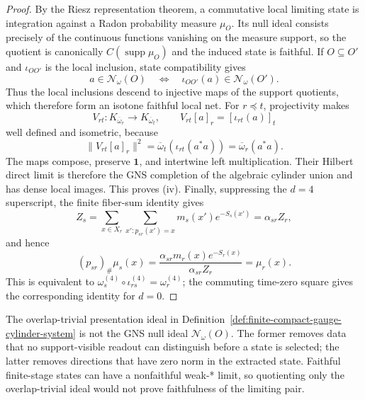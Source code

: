 \begin{proof}
By the Riesz representation theorem, a commutative local limiting state is integration against a
Radon probability measure \(\mu_O\). Its null ideal consists precisely of the continuous functions
vanishing on the measure support, so the quotient is canonically \(C(\operatorname{supp}\mu_O)\)
and the induced state is faithful. If \(O\subseteq O'\) and \(\iota_{OO'}\) is the local
inclusion, state compatibility gives
\[
a\in\mathcal N_\omega(O)
\quad\Longleftrightarrow\quad
\iota_{OO'}(a)\in\mathcal N_\omega(O').
\]
Thus the local inclusions descend to injective maps of the support quotients, which therefore form
an isotone faithful local net. For \(r\preceq t\), projectivity makes
\[
V_{rt}:K_{\overline\omega_r}\longrightarrow K_{\overline\omega_t},
\qquad
V_{rt}[a]_r=[\iota_{rt}(a)]_t
\]
well defined and isometric, because
\[
\|V_{rt}[a]_r\|^2
=\overline\omega_t(\iota_{rt}(a^*a))
=\overline\omega_r(a^*a).
\]
The maps compose, preserve \(\mathbf 1\), and intertwine left multiplication. Their Hilbert
direct limit is therefore the GNS completion of the algebraic cylinder union and has dense local
images. This proves \textup{(iv)}. Finally, suppressing the \(d=4\) superscript, the finite
fiber-sum identity gives
\[
Z_s=\sum_{x\in X_r}\sum_{x':p_{sr}(x')=x}m_s(x')e^{-S_s(x')}
=\alpha_{sr}Z_r,
\]
and hence
\[
(p_{sr})_\#\mu_s(x)
=\frac{\alpha_{sr}m_r(x)e^{-S_r(x)}}{\alpha_{sr}Z_r}
=\mu_r(x).
\]
This is equivalent to \(\omega_s^{(4)}\circ\iota_{rs}^{(4)}=\omega_r^{(4)}\); the commuting
time-zero square gives the corresponding identity for \(d=0\).
\end{proof}

\begin{remark}
\label{rem:compact-gauge-two-quotients}
The overlap-trivial presentation ideal in
Definition~\ref{def:finite-compact-gauge-cylinder-system} is not the GNS null ideal
\(\mathcal N_\omega(O)\). The former removes data that no support-visible readout can distinguish
before a state is selected; the latter removes directions that have zero norm in the extracted
state. Faithful finite-stage states can have a nonfaithful weak-* limit, so quotienting only the
overlap-trivial ideal would not prove faithfulness of the limiting pair.
\end{remark}

